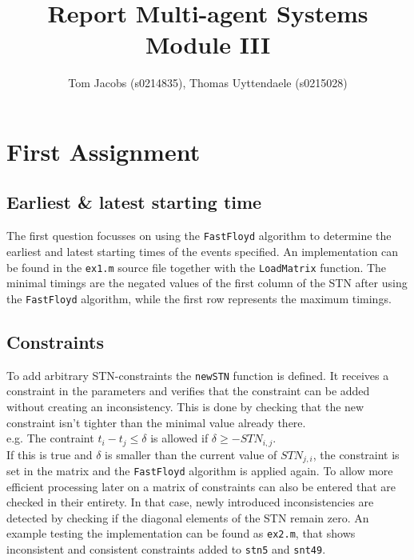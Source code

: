 \documentclass[10pt,a4paper]{article}
\title{Report Multi-agent Systems Module III}
\author{Tom Jacobs (s0214835), Thomas Uyttendaele (s0215028)}
\begin{document}
\maketitle
\tableofcontents

\section{First Assignment}
\subsection{Earliest \& latest starting time}
The first question focusses on using the \texttt{FastFloyd} algorithm to determine the earliest and latest starting times of the events specified. An implementation can be found in the \texttt{ex1.m} source file together with the \texttt{LoadMatrix} function. The minimal timings are the negated values of the first column of the STN after using the \texttt{FastFloyd} algorithm, while the first row represents the maximum timings.

\subsection{Constraints}
\label{sec:constraints}
To add arbitrary STN-constraints the \texttt{newSTN} function is defined. It receives a constraint in the parameters and verifies that the constraint can be added without creating an inconsistency. This is done by checking that the new constraint isn't tighter than the minimal value already there. \\
e.g. The contraint $t_i - t_j \leq \delta$ is allowed if $\delta \geq -STN_{i,j}$.
\\If this is true and $\delta$ is smaller than the current value of $STN_{j,i}$, the constraint is set in the matrix and the \texttt{FastFloyd} algorithm is applied again. To allow more efficient processing later on a matrix of constraints can also be entered that are checked in their entirety. In that case, newly introduced inconsistencies are detected by checking if the diagonal elements of the STN remain zero. An example testing the implementation can be found as \texttt{ex2.m}, that shows inconsistent and consistent constraints added to \texttt{stn5} and \texttt{snt49}.
\end{document}
